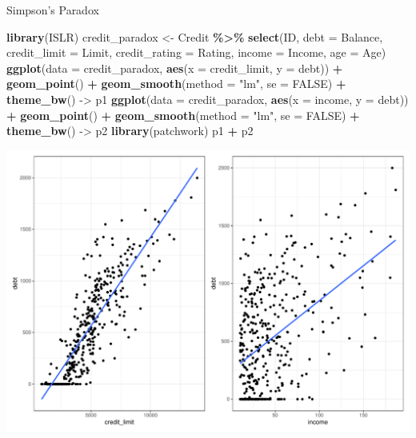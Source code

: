 \documentclass[
  ignorenonframetext,
]{beamer}
\newenvironment{Shaded}{\begin{snugshade}}{\end{snugshade}}
\newcommand{\AttributeTok}[1]{\textcolor[rgb]{0.13,0.29,0.53}{#1}}
\newcommand{\ConstantTok}[1]{\textcolor[rgb]{0.56,0.35,0.01}{#1}}
\newcommand{\FunctionTok}[1]{\textcolor[rgb]{0.13,0.29,0.53}{\textbf{#1}}}
\newcommand{\NormalTok}[1]{#1}
\newcommand{\OtherTok}[1]{\textcolor[rgb]{0.56,0.35,0.01}{#1}}
\newcommand{\SpecialCharTok}[1]{\textcolor[rgb]{0.81,0.36,0.00}{\textbf{#1}}}
\newcommand{\StringTok}[1]{\textcolor[rgb]{0.31,0.60,0.02}{#1}}
\begin{document}
\begin{frame}[fragile]{Simpson's Paradox}
\protect\hypertarget{simpsons-paradox}{}
\tiny

\begin{Shaded}
\begin{Highlighting}[]
\FunctionTok{library}\NormalTok{(ISLR)}
\NormalTok{credit\_paradox }\OtherTok{\textless{}{-}}\NormalTok{ Credit }\SpecialCharTok{\%\textgreater{}\%} 
  \FunctionTok{select}\NormalTok{(ID, }\AttributeTok{debt =}\NormalTok{ Balance, }\AttributeTok{credit\_limit =}\NormalTok{ Limit, }
         \AttributeTok{credit\_rating =}\NormalTok{ Rating, }\AttributeTok{income =}\NormalTok{ Income, }\AttributeTok{age =}\NormalTok{ Age)}
\FunctionTok{ggplot}\NormalTok{(}\AttributeTok{data =}\NormalTok{ credit\_paradox, }\FunctionTok{aes}\NormalTok{(}\AttributeTok{x =}\NormalTok{ credit\_limit, }\AttributeTok{y =}\NormalTok{ debt)) }\SpecialCharTok{+} 
  \FunctionTok{geom\_point}\NormalTok{() }\SpecialCharTok{+} 
  \FunctionTok{geom\_smooth}\NormalTok{(}\AttributeTok{method =} \StringTok{"lm"}\NormalTok{, }\AttributeTok{se =} \ConstantTok{FALSE}\NormalTok{) }\SpecialCharTok{+} 
  \FunctionTok{theme\_bw}\NormalTok{() }\OtherTok{{-}\textgreater{}}\NormalTok{ p1}
\FunctionTok{ggplot}\NormalTok{(}\AttributeTok{data =}\NormalTok{ credit\_paradox, }\FunctionTok{aes}\NormalTok{(}\AttributeTok{x =}\NormalTok{ income, }\AttributeTok{y =}\NormalTok{ debt)) }\SpecialCharTok{+} 
  \FunctionTok{geom\_point}\NormalTok{() }\SpecialCharTok{+} 
  \FunctionTok{geom\_smooth}\NormalTok{(}\AttributeTok{method =} \StringTok{"lm"}\NormalTok{, }\AttributeTok{se =} \ConstantTok{FALSE}\NormalTok{) }\SpecialCharTok{+} 
  \FunctionTok{theme\_bw}\NormalTok{() }\OtherTok{{-}\textgreater{}}\NormalTok{ p2}
\FunctionTok{library}\NormalTok{(patchwork)}
\NormalTok{p1 }\SpecialCharTok{+}\NormalTok{ p2}
\end{Highlighting}
\end{Shaded}

\begin{center}\includegraphics[width=0.8\linewidth,height=0.4\textheight]{Week5_Lect_files/figure-beamer/unnamed-chunk-48-1} \end{center}
\normalsize
\end{frame}
\end{document}
